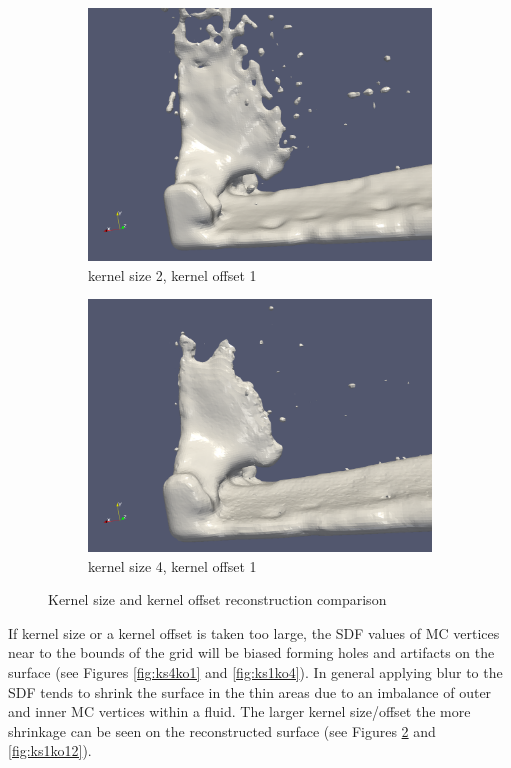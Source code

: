 \begin{figure}
\begin{subfigure}[b]{0.5\textwidth}
               \includegraphics[width=\textwidth]{figures/DBBlur_ks-2_ko-1_2.png}
               \caption{kernel size 2, kernel offset 1}
               \label{fig:ks2ko12}
        \end{subfigure}        
        \begin{subfigure}[b]{0.5\textwidth}
               \includegraphics[width=\textwidth]{figures/DBBlur_ks-4_ko-1_2.png}
               \caption{kernel size 4, kernel offset 1}
               \label{fig:ks4ko12}
        \end{subfigure}
        \caption{Kernel size and kernel offset reconstruction comparison}
        \label{fig:ksko2}
\end{figure}

If kernel size or a kernel offset is taken too large, the SDF values of MC vertices near to the bounds of the grid will be biased forming holes and artifacts on the surface (see Figures \ref{fig:ks4ko1} and \ref{fig:ks1ko4}). In general applying blur to the SDF tends to shrink the surface in the thin areas due to an imbalance of outer and inner MC vertices within a fluid. The larger kernel size/offset the more shrinkage can be seen on the reconstructed surface (see Figures \ref{fig:ks4ko12} and \ref{fig:ks1ko12}).
